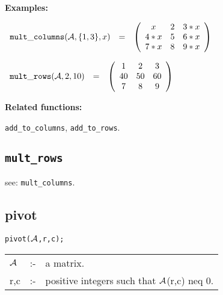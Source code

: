 {\bf Examples:}

\begin{flushleft}
\hspace*{0.1in}
\begin{math}
\begin{array}{ccc}
{\tt mult\_columns}({\cal A},\{1,3\},x) & = &
        \left( \begin{array}{ccc} x & 2 & 3*x \\ 4*x & 5 & 6*x \\ 7*x &
8 & 9*x
 \end{array} \right)
\end{array}
\end{math}
\end{flushleft}

\vspace*{0.1in}

\begin{flushleft}
\hspace*{0.1in}
\begin{math}
\begin{array}{ccc}
{\tt mult\_rows}({\cal A},2,10) & = &
        \left( \begin{array}{ccc} 1 & 2 & 3 \\ 40 & 50 & 60 \\ 7 & 8 &
9 \end{array} \right)
\end{array}
\end{math}
\end{flushleft}

{\bf Related functions:}

\hspace*{0.175in} {\tt add\_to\_columns}, {\tt add\_to\_rows}.


\subsection{\tt mult\_rows}

\hspace*{0.175in} see: {\tt mult\_columns}.


\subsection{pivot}


\hspace*{0.175in} {\tt pivot(${\cal A}$,r,c);}

\hspace*{0.1in}
\begin{tabular}{l l l}
${\cal A}$ &:-& a matrix. \\
r,c        &:-& positive integers such that ${\cal A}$(r,c) neq 0.
\end{tabular}

